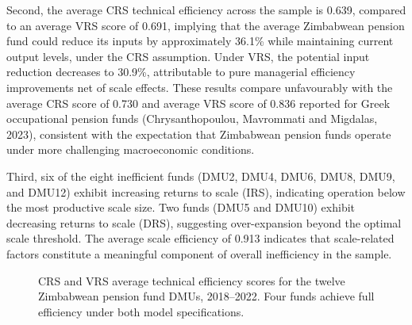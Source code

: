\documentclass[12pt,a4paper]{article}
\begin{document}
Second, the average CRS technical efficiency across the sample is 0.639, compared to an average VRS score of 0.691, implying that the average Zimbabwean pension fund could reduce its inputs by approximately 36.1\% while maintaining current output levels, under the CRS assumption. Under VRS, the potential input reduction decreases to 30.9\%, attributable to pure managerial efficiency improvements net of scale effects. These results compare unfavourably with the average CRS score of 0.730 and average VRS score of 0.836 reported for Greek occupational pension funds (Chrysanthopoulou, Mavrommati and Migdalas, 2023), consistent with the expectation that Zimbabwean pension funds operate under more challenging macroeconomic conditions.

Third, six of the eight inefficient funds (DMU2, DMU4, DMU6, DMU8, DMU9, and DMU12) exhibit increasing returns to scale (IRS), indicating operation below the most productive scale size. Two funds (DMU5 and DMU10) exhibit decreasing returns to scale (DRS), suggesting over-expansion beyond the optimal scale threshold. The average scale efficiency of 0.913 indicates that scale-related factors constitute a meaningful component of overall inefficiency in the sample.

\begin{figure}[H]
\centering
{}
\caption{CRS and VRS average technical efficiency scores for the twelve Zimbabwean pension fund DMUs, 2018--2022. Four funds achieve full efficiency under both model specifications.}
\label{fig:crs_vrs_comparison}
\end{figure}
\end{document}
